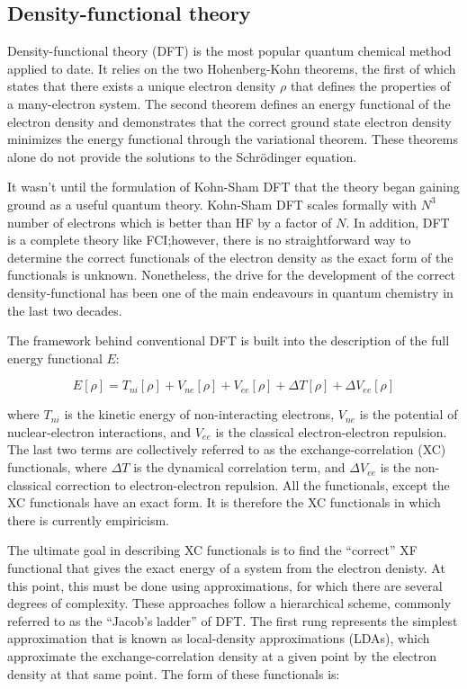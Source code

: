 \subsection{Density-functional theory}

Density-functional theory (DFT) is the most popular quantum chemical method
applied to date. It relies on the two Hohenberg-Kohn theorems, the first of
which states that there exists a unique electron density $\rho$ that defines
the properties of a many-electron system. The second theorem defines an energy
functional of the electron density and demonstrates that the correct ground
state electron density minimizes the energy functional through the variational
theorem.\cite{Hohenberg1964,Koch2000} These theorems alone do not provide the
solutions to the Schr{\"o}dinger equation.

It wasn't until the formulation of Kohn-Sham DFT\cite{Kohn1965} that the theory
began gaining ground as a useful quantum theory. Kohn-Sham DFT scales formally
with $N^3$ number of electrons\cite{Cramer2004} which is better than HF by a
factor of $N$. In addition, DFT is a complete theory like FCI;\@ however, there
is no straightforward way to determine the correct functionals of the electron
density as the exact form of the functionals is unknown. Nonetheless, the drive
for the development of the correct density-functional has been one of the main
endeavours in quantum chemistry in the last two decades.

The framework behind conventional DFT is built into the description of the full
energy functional $E$:

\begin{equation}
  E[\rho] = T_{ni}[\rho] + V_{ne}[\rho] + V_{ee}[\rho] + \Delta T[\rho] + \Delta V_{ee}[\rho]
\label{eq:DFT}
\end{equation}

\noindent where $T_{ni}$ is the kinetic energy of non-interacting electrons,
$V_{ne}$ is the potential of nuclear-electron interactions, and $V_{ee}$ is the
classical electron-electron repulsion. The last two terms are collectively
referred to as the exchange-correlation (XC) functionals, where $\Delta T$ is
the dynamical correlation term, and $\Delta V_{ee}$ is the non-classical
correction to electron-electron repulsion. All the functionals, except the XC
functionals have an exact form. It is therefore the XC functionals in which
there is currently empiricism.

The ultimate goal in describing XC functionals is to find the ``correct'' XF
functional that gives the exact energy of a system from the electron denisty.
At this point, this must be done using approximations, for which there are
several degrees of complexity. These approaches follow a hierarchical scheme,
commonly referred to as the ``Jacob's ladder'' of DFT.\cite{Perdew2005} The
first rung represents the simplest approximation that is known as
local-density approximations (LDAs), which approximate the exchange-correlation
density at a given point by the electron density at that same point. The form
of these functionals is:

